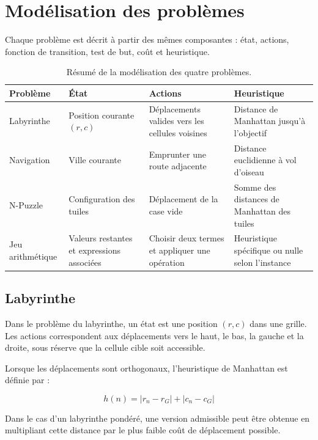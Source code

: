 \section{Modélisation des problèmes}

Chaque problème est décrit à partir des mêmes composantes : état, actions,
fonction de transition, test de but, coût et heuristique.

\begin{table}[H]
\centering
\caption{Résumé de la modélisation des quatre problèmes.}
\label{tab:modelisation}
\begin{tabularx}{\textwidth}{p{2.4cm}Y Y Y}
\toprule
\textbf{Problème} & \textbf{État} & \textbf{Actions} & \textbf{Heuristique} \\
\midrule
Labyrinthe &
Position courante $(r,c)$ &
Déplacements valides vers les cellules voisines &
Distance de Manhattan jusqu'à l'objectif \\
\addlinespace

Navigation &
Ville courante &
Emprunter une route adjacente &
Distance euclidienne à vol d'oiseau \\
\addlinespace

N-Puzzle &
Configuration des tuiles &
Déplacement de la case vide &
Somme des distances de Manhattan des tuiles \\
\addlinespace

Jeu arithmétique &
Valeurs restantes et expressions associées &
Choisir deux termes et appliquer une opération &
Heuristique spécifique ou nulle selon l'instance \\
\bottomrule
\end{tabularx}
\end{table}

\subsection{Labyrinthe}

Dans le problème du labyrinthe, un état est une position $(r,c)$ dans une
grille. Les actions correspondent aux déplacements vers le haut, le bas, la
gauche et la droite, sous réserve que la cellule cible soit accessible.

Lorsque les déplacements sont orthogonaux, l'heuristique de Manhattan est
définie par :

\[
h(n) = |r_n - r_G| + |c_n - c_G|
\]

Dans le cas d'un labyrinthe pondéré, une version admissible peut être obtenue
en multipliant cette distance par le plus faible coût de déplacement possible.


